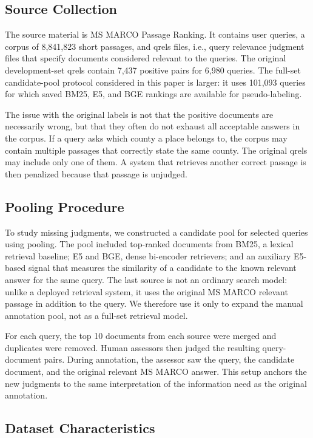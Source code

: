 \documentclass[runningheads,a4paper]{llncs}
\begin{document}
\subsection{Source Collection}

The source material is MS MARCO Passage Ranking. It contains user queries, a corpus of 8,841,823 short passages, and qrels files, i.e., query relevance judgment files that specify documents considered relevant to the queries. The original development-set qrels contain 7,437 positive pairs for 6,980 queries. The full-set candidate-pool protocol considered in this paper is larger: it uses 101,093 queries for which saved BM25, E5, and BGE rankings are available for pseudo-labeling.

The issue with the original labels is not that the positive documents are necessarily wrong, but that they often do not exhaust all acceptable answers in the corpus. If a query asks which county a place belongs to, the corpus may contain multiple passages that correctly state the same county. The original qrels may include only one of them. A system that retrieves another correct passage is then penalized because that passage is unjudged.

\subsection{Pooling Procedure}

To study missing judgments, we constructed a candidate pool for selected queries using pooling. The pool included top-ranked documents from BM25, a lexical retrieval baseline; E5 and BGE, dense bi-encoder retrievers; and an auxiliary E5-based signal that measures the similarity of a candidate to the known relevant answer for the same query. The last source is not an ordinary search model: unlike a deployed retrieval system, it uses the original MS MARCO relevant passage in addition to the query. We therefore use it only to expand the manual annotation pool, not as a full-set retrieval model.

For each query, the top 10 documents from each source were merged and duplicates were removed. Human assessors then judged the resulting query-document pairs. During annotation, the assessor saw the query, the candidate document, and the original relevant MS MARCO answer. This setup anchors the new judgments to the same interpretation of the information need as the original annotation.

\subsection{Dataset Characteristics}
\end{document}
